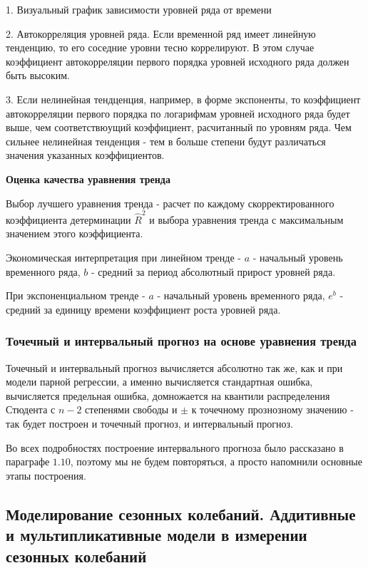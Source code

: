 \documentclass[aps,%
12pt,%
final,%
oneside,
onecolumn,%
musixtex, %
superscriptaddress,%
centertags]{article} %
\theoremstyle{plain}
\theoremstyle{definition}
\theoremstyle{remark}
\begin{document}
1. Визуальный график зависимости уровней ряда от времени

2. Автокорреляция уровней ряда. Если временной ряд имеет линейную тенденцию, то его соседние уровни тесно коррелируют. В этом случае коэффициент автокорреляции первого порядка уровней исходного ряда должен быть высоким.

3. Если нелинейная тендценция, например, в форме экспоненты, то коэффициент автокорреляции первого порядка по логарифмам уровней исходного ряда будет выше, чем соответствюущий коэффициент, расчитанный по уровням ряда. Чем сильнее нелинейная тенденция - тем в больше степени будут различаться значения указанных коэффициентов.

\textbf{Оценка качества уравнения тренда}

Выбор лучшего уравнения тренда - расчет по каждому скорректированного коэффициента детерминации $\hat{R}^2$ и выбора уравнения тренда с максимальным значением этого коэффициента.

Экономическая интерпретация при линейном тренде - $a$ - начальный уровень временного ряда, $b$ - средний за период абсолютный прирост уровней ряда.

При экспоненциальном тренде - $a$ - начальный уровень временного ряда, $e^b$ - средний за единицу времени коэффициент роста уровней ряда.

\subsubsection{Точечный и интервальный прогноз на основе уравнения тренда}

Точечный и интервальный прогноз вычисляется абсолютно так же, как и при модели парной регрессии, а именно вычисляется стандартная ошибка, вычисляется предельная ошибка, домножается на квантили распределения Стюдента с $n-2$ степенями свободы и $\pm$ к точечному прознозному значению  - так будет построен и точечный прогноз, и интервальный прогноз.

Во всех подробностях построение интервального прогноза было рассказано в параграфе $1.10$, поэтому мы не будем повторяться, а просто напомнили основные этапы построения.

\newpage
\subsection{Моделирование сезонных колебаний. Аддитивные и мультипликативные модели в измерении сезонных колебаний}
\end{document}
